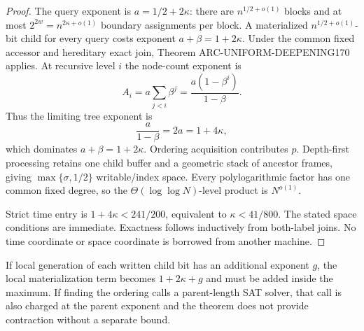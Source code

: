 \documentclass[11pt]{article}
\begin{document}
\begin{proof}
The query exponent is $a=1/2+2\kappa$: there are $n^{1/2+o(1)}$
blocks and at most $2^{2w}=n^{2\kappa+o(1)}$ boundary assignments per
block.  A materialized $n^{1/2+o(1)}$-bit child for every query costs exponent
$a+\beta=1+2\kappa$.  Under the common fixed accessor and hereditary exact
join, Theorem ARC-UNIFORM-DEEPENING170 applies.  At recursive level $i$ the
node-count exponent is
\[
 A_i=a\sum_{j<i}\beta^j
 =\frac{a(1-\beta^i)}{1-\beta}.
\]
Thus the limiting tree exponent is
\[
 \frac{a}{1-\beta}=2a=1+4\kappa,
\]
which dominates $a+\beta=1+2\kappa$.  Ordering acquisition contributes $p$.
Depth-first processing retains one child buffer and a geometric stack of
ancestor frames, giving $\max\{\sigma,1/2\}$ writable/index space.  Every
polylogarithmic factor has one common fixed degree, so the
$\Theta(\log\log N)$-level product is $N^{o(1)}$.

Strict time entry is $1+4\kappa<241/200$, equivalent to
$\kappa<41/800$.  The stated space conditions are immediate.  Exactness
follows inductively from both-label joins.  No time coordinate or space
coordinate is borrowed from another machine.
\end{proof}

If local generation of each written child bit has an additional exponent
$g$, the local materialization term becomes $1+2\kappa+g$ and must be added
inside the maximum.  If finding the ordering calls a parent-length SAT
solver, that call is also charged at the parent exponent and the theorem does
not provide contraction without a separate bound.
\end{document}
